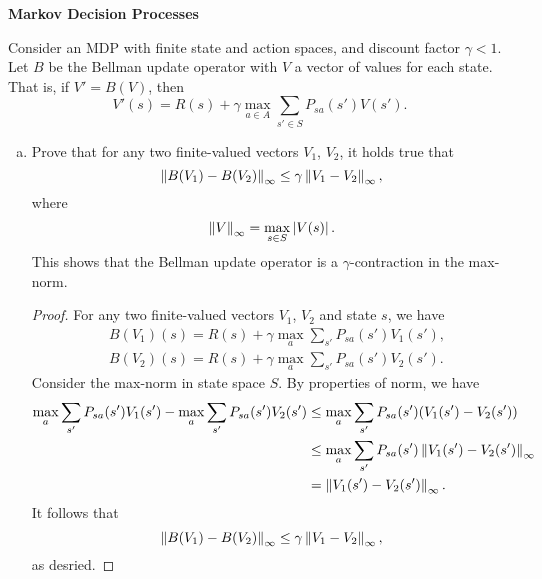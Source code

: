 \documentclass[12pt,letterpaper,boxed]{hmcpset}
\begin{document}
\newpage
\begin{problem}[Problem 5]
  \textbf{Markov Decision Processes}

  Consider an MDP with finite state and action spaces, and discount factor $\gamma < 1$. Let $B$ be the Bellman update operator with $V$ a vector of values for each state. That is, if $V' = B(V)$, then
  \[
  V'(s) = R(s) + \gamma \max_{a \in A} \sum_{s' \in S} P_{sa}(s') V(s').
  \]
\end{problem}
\begin{solution}
  \begin{enumerate}[(a)]
    \item Prove that for any two finite-valued vectors $V_1$, $V_2$, it holds true that
    \[
    \left\lVert B(V_1) - B(V_2)\right\rVert_{\infty} \leq \gamma \left\lVert V_1 - V_2\right\rVert_{\infty},
    \]
    where 
    \[
    \left\lVert V\right\rVert_{\infty} = \max_{s \in S} \left\lvert V(s)\right\rvert.
    \]
    This shows that the Bellman update operator is a $\gamma$-contraction in the max-norm.
    
    \begin{proof}
      For any two finite-valued vectors $V_1$, $V_2$ and state $s$, we have
      \[
      \begin{aligned}
        & B(V_1) (s) = R(s) + \gamma \max_{a} \sum_{s'} P_{sa}(s') V_1(s'), \\
        & B(V_2) (s) = R(s) + \gamma \max_{a} \sum_{s'} P_{sa}(s') V_2(s').
      \end{aligned}
      \]  
      Consider the max-norm in state space $S$. By properties of norm, we have
      \[
      \begin{aligned}
        \max_{a} \sum_{s'} P_{sa}(s') V_1(s') - \max_{a} \sum_{s'} P_{sa}(s') V_2(s') &\leq \max_a \sum_{s'} P_{sa}(s') (V_1(s') - V_2(s')) \\
        & \leq \max_a \sum_{s'} P_{sa}(s') \left\lVert V_1(s') - V_2(s')\right\rVert_{\infty} \\
        &= \left\lVert V_1(s') - V_2(s')\right\rVert_{\infty}.
      \end{aligned}
      \]
      It follows that 
      \[
      \left\lVert B(V_1) - B(V_2)\right\rVert_{\infty} \leq \gamma \left\lVert V_1 - V_2\right\rVert_{\infty},
      \]
      as desried.
    \end{proof}
  \end{enumerate}
\end{solution}
\end{document}
